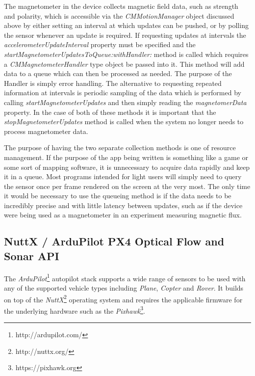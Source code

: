\documentclass[paper=letter, fontsize=11pt]{scrartcl}
\numberwithin{equation}{section}
\numberwithin{figure}{section}
\numberwithin{table}{section}
\begin{document}
\par
The magnetometer in the device collects magnetic field data, such as strength
and polarity, which is accessible via the {\em CMMotionManager} object discussed
above by either setting an interval at which updates can be pushed, or by
polling the sensor whenever an update is required. If requesting updates at
intervals the {\em accelerometerUpdateInterval} property must be specified and
the {\em startMagnetometerUpdatesToQueue:withHandler:} method is called which
requires a {\em CMMagnetometerHandler} type object be passed into it. This
method will add data to a queue which can then be processed as needed. The
purpose of the Handler is simply error handling. The alternative to requesting
repeated information at intervals is periodic sampling of the data which is
performed by calling {\em startMagnetometerUpdates} and then simply reading the
{\em magnetomerData} property. In the case of both of these methods it is
important that the {\em stopMagnetometerUpdates} method is called when the
system no longer needs to process magnetometer data.

\par
The purpose of having the two separate collection methods is one of resource
management. If the purpose of the app being written is something like a game or
some sort of mapping software, it is unnecessary to acquire data rapidly and
keep it in a queue. Most programs intended for light users will simply need to
query the sensor once per frame rendered on the screen at the very most. The
only time it would be necessary to use the queueing method is if the data needs to be incredibly
precise and with little latency between updates, such as if the device were
being used as a magnetometer in an experiment measuring magnetic flux.

\subsection{NuttX / ArduPilot PX4 Optical Flow and Sonar API}
\label{ardupilot_flow_api}
\par
The {\em ArduPilot}\footnote{http://ardupilot.com/} autopilot stack supports a
wide range of sensors to be used with any of the supported vehicle types
including {\em Plane}, {\em Copter} and {\em Rover}. It builds on top of the
{\em NuttX}\footnote{http://nuttx.org/} operating system and requires the
applicable firmware for the underlying hardware such as the
{\em Pixhawk}\footnote{https://pixhawk.org}.
\end{document}
